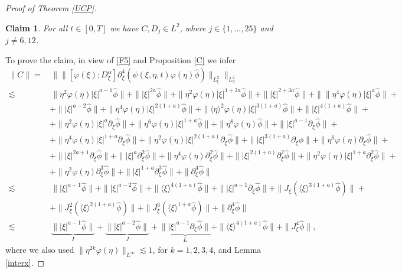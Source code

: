 \documentclass[reqno]{amsart}
\newcommand{\ha}{\hat{\phi}}
\newcommand{\va}{\varphi}
\newcommand{\les}{\lesssim}
\newcommand{\lan}{\langle \xi \rangle}
\newcommand{\p}{\partial}
\numberwithin{equation}{section}
\newtheorem{claim}[theorem]{Claim}
\begin{document}
\begin{proof}[Proof of Theorem \ref{UCP}]
\begin{claim}\label{claim3}
For all $t\in [0,T]$ we have $C,D_j\in L^2$, where $j\in \{1,...,25\}$ and $j\neq 6,12$. 
\end{claim}
To prove the claim, in view of \eqref{F5} and Proposition \ref{C} we infer
\begin{equation}
\begin{split}\label{dsC}
\|C\|=&\,\|\|[\va(\xi);D_{\xi}^{\alpha}]\partial_{\xi}^4(\psi(\xi,\eta,t) \va(\eta) \hat{\phi})\|_{L^2_\xi}\|_{L^2_\eta}\\
\les&\, \|\eta^2\va(\eta)|\xi|^{a-1}\ha\|+\||\xi|^{2a}\ha\|+\|\eta^2\va(\eta)|\xi|^{1+2a}\ha\|+\||\xi|^{2+3a}\ha\|+\|\|\eta^4\va(\eta)|\xi|^{a}\ha\|+\\
&+\||\xi|^{a-2}\ha\|+\|\eta^4\va(\eta)|\xi|^{2(1+a)}\ha\|+\|\langle\eta\rangle^2\va(\eta)|\xi|^{3(1+a)}\ha\|+\||\xi|^{4(1+a)}\ha\|+\\
&+\|\eta^2\va(\eta)|\xi|^a \p_\xi \ha\|+\|\eta^6\va(\eta)|\xi|^{1+a}\ha\|+ \|\eta^8\va(\eta)\ha\|+\||\xi|^{a-1}\p_\xi \ha\|+\\
&+\|\eta^4\va(\eta)|\xi|^{1+a}\p_\xi \ha\|+\|\eta^2\va(\eta)|\xi|^{2(1+a)}\p_\xi \ha\|+\||\xi|^{3(1+a)}\p_\xi \ha\|+\|\eta^6\va(\eta)\p_\xi \ha\|+\\
&+\||\xi|^{2a+1}\p_\xi\ha\|+\||\xi|^a \p_\xi^2 \ha\|+\|\eta^4\va(\eta)\p_\xi^2 \ha\|+\||\xi|^{2(1+a)}\p_\xi^2 \ha\|+\|\eta^2\va(\eta)|\xi|^{1+a}\p_\xi^2 \ha\|+\\
&+\|\eta^2\va(\eta)\p_\xi^3 \ha\|+\||\xi|^{1+a}\p_\xi^3 \ha\|+\|\p_\xi^4\ha\|\\
\les&\, \||\xi|^{a-1}\ha\|+\||\xi|^{a-2}\ha\|+\|\lan^{4(1+a)}\ha\|+\||\xi|^{a-1}\p_\xi \ha\|+\|J_\xi(\lan^{3(1+a)}\ha)\|+\\
&+\|J_\xi^2(\lan^{2(1+a)}\ha)\|+\|J_\xi^3(\lan^{1+a}\ha)\|+\|\p_\xi^4\ha\|\\
\les&\, \underbrace{\||\xi|^{a-1}\ha\|}_{I}+\underbrace{\||\xi|^{a-2}\ha\|}_{J}+\underbrace{\||\xi|^{a-1}\p_\xi \ha\|}_{L}+\|\lan^{4(1+a)}\ha\|+\|J_\xi^4 \ha\|,
\end{split}
\end{equation}
where  we also used $\|\eta^{2k}\va(\eta)\|_{L^\infty}\les 1$, for $k=1,2,3,4$, and Lemma \ref{interx}.


\end{proof}
\end{document}

